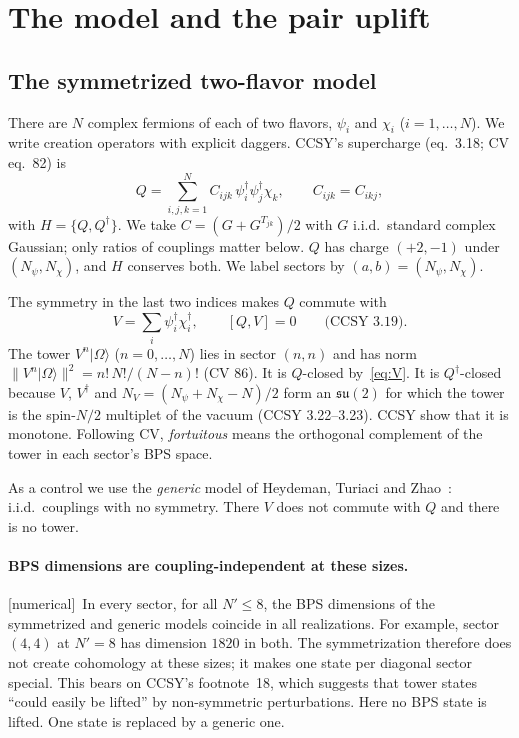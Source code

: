 \documentclass[11pt]{article}
\newcommand{\Om}{|\Omega\rangle}
\newcommand{\tagbox}[2]{\textsf{\small\color{#1}[#2]}}
\newcommand{\NUM}{\tagbox{cnum}{numerical}}
\theoremstyle{plain}
\theoremstyle{remark}
\numberwithin{equation}{section}
\begin{document}
\section{The model and the pair uplift}\label{sec:setup}

\subsection{The symmetrized two-flavor model}

There are $N$ complex fermions of each of two flavors, $\psi_i$ and $\chi_i$ ($i=1,\dots,N$). We write creation
operators with explicit daggers. CCSY's supercharge (eq.~3.18; CV eq.~82) is
\begin{equation}\label{eq:Q}
Q=\sum_{i,j,k=1}^N C_{ijk}\,\psi_i^\dagger\psi_j^\dagger\chi_k ,\qquad C_{ijk}=C_{ikj},
\end{equation}
with $H=\{Q,Q^\dagger\}$. We take $C=(G+G^{T_{jk}})/2$ with $G$ i.i.d.\ standard complex Gaussian; only ratios of
couplings matter below. $Q$ has charge $(+2,-1)$ under $(N_\psi,N_\chi)$, and $H$ conserves both. We label sectors by
$(a,b)=(N_\psi,N_\chi)$.

The symmetry in the last two indices makes $Q$ commute with
\begin{equation}\label{eq:V}
V=\sum_i\psi_i^\dagger\chi_i^\dagger ,\qquad [Q,V]=0\qquad\text{(CCSY 3.19)}.
\end{equation}
The tower $V^n\Om$ ($n=0,\dots,N$) lies in sector $(n,n)$ and has norm $\|V^n\Om\|^2=n!\,N!/(N-n)!$ (CV 86). It is $Q$-closed
by~\eqref{eq:V}. It is $Q^\dagger$-closed because $V$, $V^\dagger$ and $N_V=(N_\psi+N_\chi-N)/2$ form an $\mathfrak{su}(2)$
for which the tower is the spin-$N/2$ multiplet of the vacuum (CCSY 3.22--3.23). CCSY show that it is monotone. Following
CV, \emph{fortuitous} means the orthogonal complement of the tower in each sector's BPS space.

As a control we use the \emph{generic} model of Heydeman, Turiaci and Zhao~\cite{HTZ}: i.i.d.\ couplings with no
symmetry. There $V$ does not commute with $Q$ and there is no tower.

\paragraph{BPS dimensions are coupling-independent at these sizes.} \NUM\ In every sector, for all $N'\le8$, the BPS
dimensions of the symmetrized and generic models coincide in all realizations. For example, sector $(4,4)$ at $N'=8$ has
dimension $1820$ in both. The symmetrization therefore does not create cohomology at these sizes; it makes one state per
diagonal sector special. This bears on CCSY's footnote~18, which suggests that tower states ``could easily be lifted'' by
non-symmetric perturbations. Here no BPS state is lifted. One state is replaced by a generic one.
\end{document}
